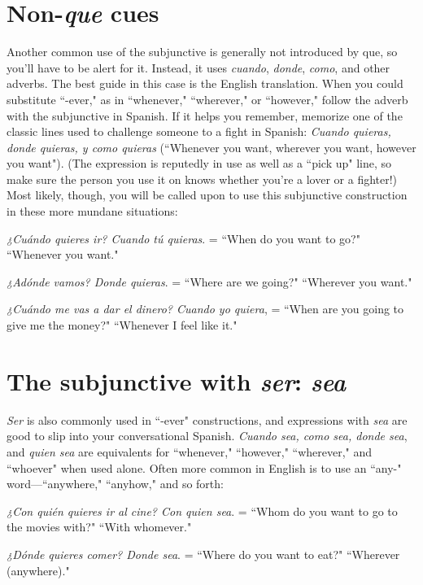 \section{Non-\emph{que} cues}

Another common use of the subjunctive is generally not introduced by que, so you'll have to be alert for it. Instead, it uses \emph{cuando},
\emph{donde}, \emph{como}, and other adverbs.
The best guide in this case is the English translation.
When you could substitute ``-ever," as in ``whenever," ``wherever,"
or ``however," follow the adverb with the subjunctive
in Spanish. If it helps you remember, memorize one of the classic
lines used to challenge someone to a fight in Spanish: \emph{Cuando quieras,
	donde quieras, y como quieras} (``Whenever you want, wherever you
want, however you want"). (The expression is reputedly in use as well
as a ``pick up" line, so make sure the person you use it on knows
whether you're a lover or a fighter!) Most likely, though, you will be
called upon to use this subjunctive construction in these more mundane situations:

\bsk

\indu \emph{¿Cuándo quieres ir? Cuando tú quieras}. = ``When do you
want to go?" ``Whenever you want."

\indu \emph{¿Adónde vamos? Donde quieras}. = ``Where are we going?"
``Wherever you want."

\indu \emph{¿Cuándo me vas a dar el dinero? Cuando yo quiera}, = ``When
are you going to give me the money?" ``Whenever I
feel like it."

\section{The subjunctive with \emph{ser}: \emph{sea}}

\emph{Ser} is also commonly used in ``-ever" constructions, and expressions with \emph{sea} are good to slip into your conversational Spanish.
\emph{Cuando sea, como sea, donde sea}, and \emph{quien sea} are equivalents for
``whenever," ``however," ``wherever," and ``whoever" when used alone.
Often more common in English is to use an ``any-" word---``anywhere," ``anyhow," and so forth:

\bsk

\indu \emph{¿Con quién quieres ir al cine? Con quien sea}. = ``Whom
do you want to go to the movies with?" ``With
whomever."

\indu \emph{¿Dónde quieres comer? Donde sea}. = ``Where do you want to
eat?" ``Wherever (anywhere)."

